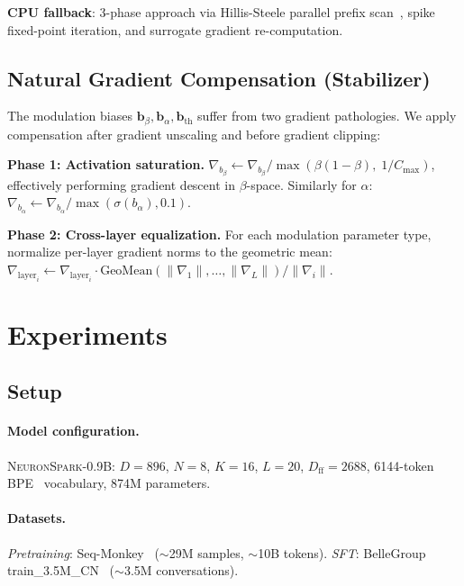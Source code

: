 \documentclass{article}
\newcommand{\model}{\textsc{NeuronSpark}}
\begin{document}
\textbf{CPU fallback}: 3-phase approach via Hillis-Steele parallel prefix scan~\citep{blelloch1990prefix, martin2018parallelizing}, spike fixed-point iteration, and surrogate gradient re-computation.

\subsection{Natural Gradient Compensation (Stabilizer)}
\label{sec:natural-gradient}

The modulation biases $\mathbf{b}_\beta, \mathbf{b}_\alpha, \mathbf{b}_{\text{th}}$ suffer from two gradient pathologies.
We apply compensation after gradient unscaling and before gradient clipping:

\textbf{Phase 1: Activation saturation.}
$\nabla_{b_\beta} \leftarrow \nabla_{b_\beta} / \max(\beta(1-\beta),\; 1/C_{\max})$, effectively performing gradient descent in $\beta$-space.
Similarly for $\alpha$: $\nabla_{b_\alpha} \leftarrow \nabla_{b_\alpha} / \max(\sigma(b_\alpha), 0.1)$.

\textbf{Phase 2: Cross-layer equalization.}
For each modulation parameter type, normalize per-layer gradient norms to the geometric mean:
$\nabla_{\text{layer}_i} \leftarrow \nabla_{\text{layer}_i} \cdot \text{GeoMean}(\|\nabla_1\|, \ldots, \|\nabla_L\|) / \|\nabla_i\|$.

\section{Experiments}
\label{sec:experiments}

\subsection{Setup}

\paragraph{Model configuration.}
\model{}-0.9B: $D=896$, $N=8$, $K=16$, $L=20$, $D_{\text{ff}}=2688$, 6144-token BPE~\citep{sennrich2016neural} vocabulary, 874M parameters.

\paragraph{Datasets.}
\emph{Pretraining}: Seq-Monkey~\citep{seqmonkey2023} ($\sim$29M samples, $\sim$10B tokens).
\emph{SFT}: BelleGroup train\_3.5M\_CN~\citep{bellegroup2023} ($\sim$3.5M conversations).
\end{document}
